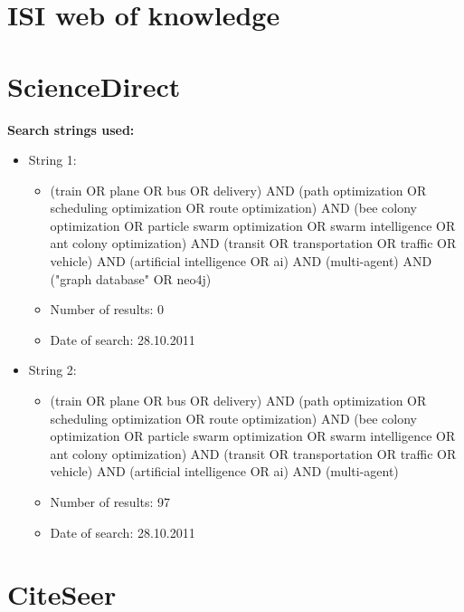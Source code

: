 \begin{itemize}
\end{itemize}


\section{ISI web of knowledge}


\section{ScienceDirect}
\textbf{Search strings used:}
\begin{itemize}
\item String 1:
\begin{itemize}
\item (train OR plane OR bus OR delivery) AND (path optimization OR scheduling optimization OR route optimization) AND (bee colony optimization OR particle swarm optimization OR swarm intelligence OR ant colony optimization) AND (transit OR transportation OR traffic OR vehicle) AND (artificial intelligence OR ai) AND (multi-agent) AND ("graph database" OR neo4j)
\item Number of results: 0
\item Date of search: 28.10.2011
\end{itemize}
\item String 2:
\begin{itemize}
\item (train OR plane OR bus OR delivery) AND (path optimization OR scheduling optimization OR route optimization) AND (bee colony optimization OR particle swarm optimization OR swarm intelligence OR ant colony optimization) AND (transit OR transportation OR traffic OR vehicle) AND (artificial intelligence OR ai) AND (multi-agent)
\item Number of results: 97
\item Date of search: 28.10.2011
\end{itemize}
\end{itemize}


\section{CiteSeer}

